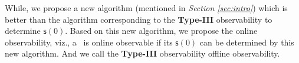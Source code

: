 

 While, we propose a new algorithm (mentioned in {\em Section \ref{sec:intro}}) which is better than the algorithm corresponding to the {\bf Type-III} observability to determine $\mathsf{s}(0)$. Based on this new algorithm, we propose the online observability, viz., a \BCN\ is online observable if its $\mathsf{s}(0)$ can be determined by this new algorithm. And we call the {\bf Type-III} observability offline observability.


